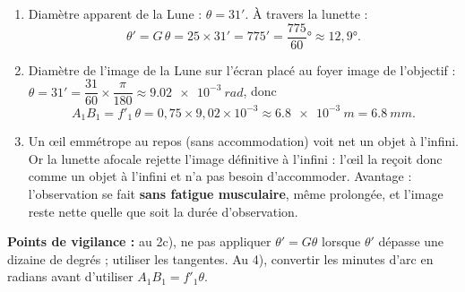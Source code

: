 \documentclass[11pt]{article}
\begin{document}
\begin{corrige}
\begin{enumerate}
\begin{enumerate}
\begin{itemize}
\end{itemize}
\item[c)] On mesure $\theta' \approx 75°$ ? Non — plus rigoureusement, pour $G = 25$ et $\theta = 3°$, la relation exacte est $\tan\theta' = G\tan\theta$, soit $\tan\theta' = 25 \times 0{,}0524 = 1{,}31$, d'où $\theta' \approx 52{,}6°$. La mesure au rapporteur donne une valeur voisine de $53°$, et $G_{\text{graphique}} = \dfrac{\tan\theta'}{\tan\theta} \approx 25$, en accord avec le calcul. (L'approximation des petits angles $\theta' \approx G\theta$ n'est plus valable ici car $\theta'$ est grand : il faut comparer les \emph{tangentes}.)
\end{enumerate}
\item Diamètre apparent de la Lune : $\theta = 31'$. À travers la lunette :
\[ \theta' = G\,\theta = 25 \times 31' = 775' = \dfrac{775}{60}° \approx 12{,}9°. \]
\item Diamètre de l'image de la Lune sur l'écran placé au foyer image de l'objectif : $\theta = 31' = \dfrac{31}{60}\times\dfrac{\pi}{180} \approx \SI{9,02e-3}{rad}$, donc
\[ A_1B_1 = f'_1\,\theta = 0{,}75 \times 9{,}02\times10^{-3} \approx \SI{6,8e-3}{m} = \SI{6,8}{mm}. \]
\item Un œil emmétrope au repos (sans accommodation) voit net un objet à l'infini. Or la lunette afocale rejette l'image définitive à l'infini : l'œil la reçoit donc comme un objet à l'infini et n'a pas besoin d'accommoder. Avantage : l'observation se fait \textbf{sans fatigue musculaire}, même prolongée, et l'image reste nette quelle que soit la durée d'observation.
\end{enumerate}
\textbf{Points de vigilance :} au 2c), ne pas appliquer $\theta' = G\theta$ lorsque $\theta'$ dépasse une dizaine de degrés ; utiliser les tangentes. Au 4), convertir les minutes d'arc en radians avant d'utiliser $A_1B_1 = f'_1\theta$.
\end{corrige}
\end{document}
